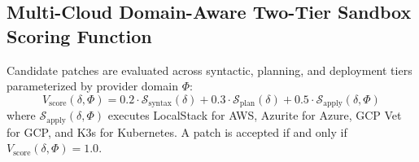 \documentclass[runningheads]{llncs}
\begin{document}
\subsection{Multi-Cloud Domain-Aware Two-Tier Sandbox Scoring Function}
Candidate patches are evaluated across syntactic, planning, and deployment tiers parameterized by provider domain $\Phi$:
\begin{equation}
V_{\mathrm{score}}(\delta, \Phi) = 0.2 \cdot \mathcal{S}_{\mathrm{syntax}}(\delta) + 0.3 \cdot \mathcal{S}_{\mathrm{plan}}(\delta) + 0.5 \cdot \mathcal{S}_{\mathrm{apply}}(\delta, \Phi)
\end{equation}
where $\mathcal{S}_{\mathrm{apply}}(\delta, \Phi)$ executes LocalStack for AWS, Azurite for Azure, GCP Vet for GCP, and K3s for Kubernetes. A patch is accepted if and only if $V_{\mathrm{score}}(\delta, \Phi) = 1.0$.
\end{document}
